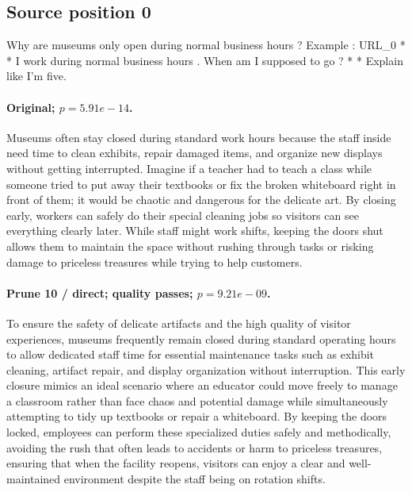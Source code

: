 \subsection*{Source position 0}
Why are museums only open during normal business hours ? Example : URL\_0 * * I work during normal business hours . When am I supposed to go ? * * Explain like I'm five.

\paragraph{Original; $p=5.91e-14$.} Museums often stay closed during standard work hours because the staff inside need time to clean exhibits, repair damaged items, and organize new displays without getting interrupted. Imagine if a teacher had to teach a class while someone tried to put away their textbooks or fix the broken whiteboard right in front of them; it would be chaotic and dangerous for the delicate art. By closing early, workers can safely do their special cleaning jobs so visitors can see everything clearly later. While staff might work shifts, keeping the doors shut allows them to maintain the space without rushing through tasks or risking damage to priceless treasures while trying to help customers.


\paragraph{Prune 10 / direct; quality passes; $p=9.21e-09$.} To ensure the safety of delicate artifacts and the high quality of visitor experiences, museums frequently remain closed during standard operating hours to allow dedicated staff time for essential maintenance tasks such as exhibit cleaning, artifact repair, and display organization without interruption. This early closure mimics an ideal scenario where an educator could move freely to manage a classroom rather than face chaos and potential damage while simultaneously attempting to tidy up textbooks or repair a whiteboard. By keeping the doors locked, employees can perform these specialized duties safely and methodically, avoiding the rush that often leads to accidents or harm to priceless treasures, ensuring that when the facility reopens, visitors can enjoy a clear and well-maintained environment despite the staff being on rotation shifts.

